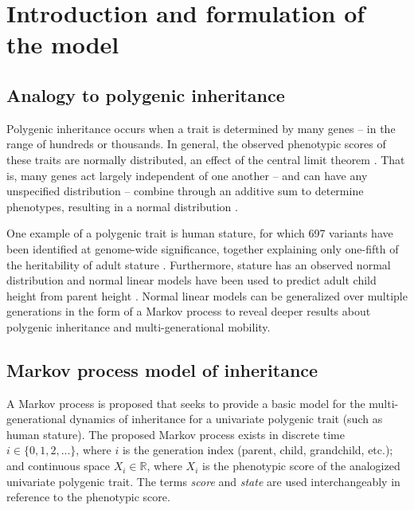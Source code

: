 \documentclass[a4paper,11pt]{article} %
\begin{document}
\let\thefootnote\relax{}


\newpage

\tableofcontents
\clearpage





\section{Introduction and formulation of the model}

\subsection{Analogy to polygenic inheritance}
Polygenic inheritance occurs when a trait is determined by many genes -- in the range of hundreds or thousands. In general, the observed phenotypic scores of these traits are normally distributed, an effect of the central limit theorem \cite{rieger, lange_article}. That is, many genes act largely independent of one another -- and can have any unspecified distribution -- combine through an additive sum to determine phenotypes, resulting in a normal distribution \cite{lange_book}. 

One example of a polygenic trait is human stature, for which 697 variants have been identified at genome-wide significance, together explaining only one-fifth of the heritability of adult stature \cite{preece, wood}. Furthermore, stature has an observed normal distribution and normal linear models have been used to predict adult child height from parent height \cite{luo}. Normal linear models can be generalized over multiple generations in the form of a Markov process to reveal deeper results about polygenic inheritance and multi-generational mobility. 

\subsection{Markov process model of inheritance}


A Markov process is proposed that seeks to provide a basic model for the multi-generational dynamics of inheritance for a univariate polygenic trait (such as human stature). The proposed Markov process exists in discrete time $ i \in \{0, 1, 2,...\}$, where $i$ is the generation index (parent, child, grandchild, etc.); and continuous space $X_i \in \mathbb{R}$, where $X_i$ is the phenotypic score of the analogized univariate polygenic trait. The terms \emph{score} and \emph{state} are used interchangeably in reference to the phenotypic score. 
\end{document}
